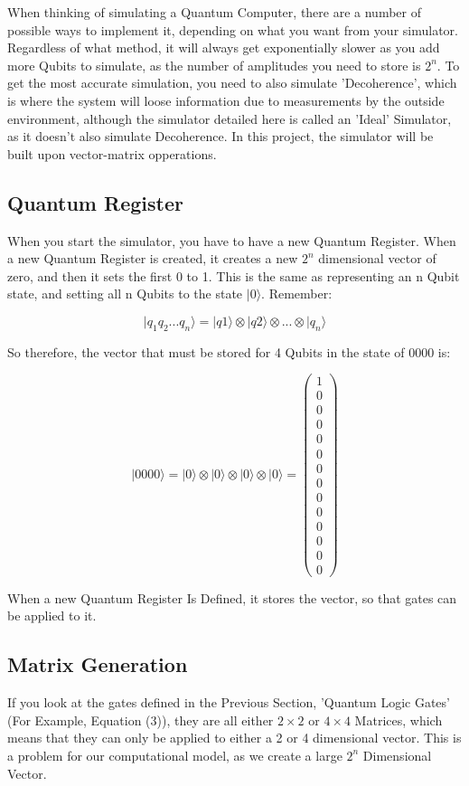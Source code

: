 \documentclass[../main.tex]{subfiles}
\begin{document}
When thinking of simulating a Quantum Computer, there are a number of possible ways to implement it, depending on what you want from your simulator.
Regardless of what method, it will always get exponentially slower as you add more Qubits to simulate, as the number of amplitudes you need to store is \(2^n\). 
To get the most accurate simulation, you need to also simulate 'Decoherence', which is where the system will loose information due to measurements by the outside environment, although the simulator detailed here is called an 'Ideal' Simulator, as it doesn't also simulate Decoherence.
In this project, the simulator will be built upon vector-matrix opperations.

\subsection{Quantum Register}
When you start the simulator, you have to have a new Quantum Register. When a new Quantum Register is created, it creates a new \(2^n\) dimensional vector of zero, and then it sets the first 0 to 1. This is the same as representing an n Qubit state, and setting all n Qubits to the state \(\lvert0\rangle\). Remember:

$$
\lvert q_1 q_2...q_n \rangle = \lvert q1 \rangle \otimes \lvert q2 \rangle \otimes ... \otimes \lvert q_n \rangle
$$

So therefore, the vector that must be stored for 4 Qubits in the state of 0000 is:

$$
\lvert0000\rangle = \lvert0\rangle \otimes \lvert0\rangle \otimes \lvert0\rangle \otimes \lvert0\rangle = \left( \begin{matrix} 1 \\ 0 \\ 0 \\ 0 \\ 0 \\ 0 \\ 0 \\ 0 \\ 0 \\ 0 \\ 0 \\ 0 \\ 0 \\ 0 \end{matrix} \right)
$$

When a new Quantum Register Is Defined, it stores the vector, so that gates can be applied to it.

\subsection{Matrix Generation}
If you look at the gates defined in the Previous Section, 'Quantum Logic Gates' (For Example, Equation (3)), they are all either \(2\times2\) or \(4\times4\) Matrices, which means that they can only be applied to either a 2 or 4 dimensional vector. This is a problem for our computational model, as we create a large \(2^n\) Dimensional Vector.
\end{document}

